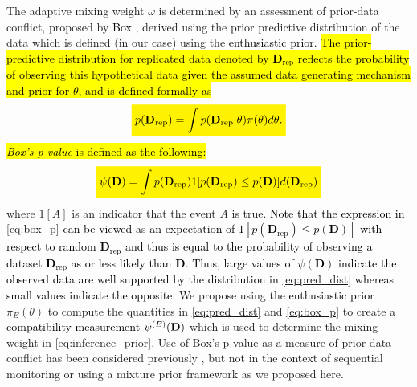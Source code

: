 \documentclass[12pt]{article}
\newcommand{\mathcolorbox}[2]{\colorbox{#1}{$\displaystyle #2$}}
\begin{document}
The adaptive mixing weight $\omega$ is determined by an assessment of prior-data conflict, proposed by \textcolor{black}{Box} \citep{Box1980}, derived using the prior predictive distribution of 
the data which is defined (in our case) using the \textcolor{black}{enthusiastic prior}.
\hl{The prior-predictive distribution for replicated data denoted by $\mathbf{D}_{\text{rep}}$ reflects the probability of observing this hypothetical data given 
the assumed data generating mechanism and prior for $\theta$, and is defined formally as}
\begin{equation}\label{eq:pred_dist}
\mathcolorbox{yellow}{p(\mathbf{D}_{\text{rep}}) =\int p(\mathbf{D}_{\text{rep}}|\theta)\pi(\theta)d\theta.}
\end{equation}
\hl{\textit{Box's p-value} is defined as the following:}
\begin{equation}\label{eq:box_p}
\mathcolorbox{yellow}{\psi({\textcolor{black}{\mathbf{D}}})=\int {p(\textcolor{black}{\mathbf{D}_{\text{rep}}})}  1[p(\textcolor{black}{\mathbf{D}_{\text{rep}}})\leq p(\textcolor{black}{\mathbf{D}})] d(\textcolor{black}{\mathbf{D}_{\text{rep}}})}
\end{equation}
%
where $1[A]$ is an indicator that the event $A$ is true.
%
\textcolor{black}{Note that the expression in \eqref{eq:box_p} can be viewed as an expectation of $1[p(\mathbf{D}_{\text{rep}})\leq p(\mathbf{D})]$ with respect to random $\mathbf{D}_{\text{rep}}$ and thus is equal to the probability of observing a dataset $\mathbf{D}_{\text{rep}}$ as or less likely than $\mathbf{D}$. Thus, large values of $\psi({\mathbf{D}})$ indicate the observed data are well supported by the distribution in \eqref{eq:pred_dist} whereas small values indicate the opposite. 
}
%
%
We propose using the \textcolor{black}{enthusiastic prior} $\pi_E(\theta)$ to compute the quantities in \eqref{eq:pred_dist} and \eqref{eq:box_p} to create \textcolor{black}{a compatibility measurement} $\psi^{(E)}(\textcolor{black}{\mathbf{D}})$ which \textcolor{black}{is} used to determine the mixing weight in \eqref{eq:inference_prior}. Use of Box's p-value as a measure of prior-data conflict has been considered previously \citep{PsiodaXue2020}, but not in the context of sequential monitoring or using a mixture prior framework as we proposed here.
\end{document}
